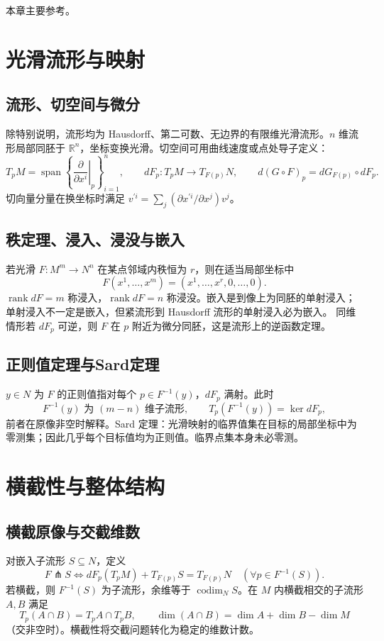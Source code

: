 \documentclass[../main.tex]{subfiles}
\begin{document}
本章主要参考\cite{lee,hatcher}。

\section{光滑流形与映射}
\subsection{流形、切空间与微分}
除特别说明，流形均为 Hausdorff、第二可数、无边界的有限维光滑流形。$n$ 维流形局部同胚于 $\mathbb R^n$，坐标变换光滑。切空间可用曲线速度或点处导子定义：
\[
T_pM=\operatorname{span}\left\{\left.\frac\partial{\partial x^i}\right|_p\right\}_{i=1}^n,
\qquad dF_p:T_pM\to T_{F(p)}N,
\qquad d(G\circ F)_p=dG_{F(p)}\circ dF_p.
\]
切向量分量在换坐标时满足 $v^{\prime i}=\sum_j(\partial x^{\prime i}/\partial x^j)v^j$。
\subsection{秩定理、浸入、浸没与嵌入}
若光滑 $F:M^m\to N^n$ 在某点邻域内秩恒为 $r$，则在适当局部坐标中
\[
F(x^1,\ldots,x^m)=(x^1,\ldots,x^r,0,\ldots,0).
\]
$\operatorname{rank}dF=m$ 称浸入，$\operatorname{rank}dF=n$ 称浸没。嵌入是到像上为同胚的单射浸入；单射浸入不一定是嵌入，但紧流形到 Hausdorff 流形的单射浸入必为嵌入。
同维情形若 $dF_p$ 可逆，则 $F$ 在 $p$ 附近为微分同胚，这是流形上的逆函数定理。
\subsection{正则值定理与Sard定理}
$y\in N$ 为 $F$ 的正则值指对每个 $p\in F^{-1}(y)$，$dF_p$ 满射。此时
\[
F^{-1}(y)\text{ 为 }(m-n)\text{ 维子流形},\qquad
T_p(F^{-1}(y))=\ker dF_p,
\]
前者在原像非空时解释。Sard 定理：光滑映射的临界值集在目标的局部坐标中为零测集；因此几乎每个目标值均为正则值。临界点集本身未必零测。
\section{横截性与整体结构}
\subsection{横截原像与交截维数}
对嵌入子流形 $S\subseteq N$，定义
\[
F\pitchfork S\iff dF_p(T_pM)+T_{F(p)}S=T_{F(p)}N
\quad(\forall p\in F^{-1}(S)).
\]
若横截，则 $F^{-1}(S)$ 为子流形，余维等于 $\operatorname{codim}_N S$。在 $M$ 内横截相交的子流形 $A,B$ 满足
\[
T_p(A\cap B)=T_pA\cap T_pB,\qquad
\dim(A\cap B)=\dim A+\dim B-\dim M
\]
（交非空时）。横截性将交截问题转化为稳定的维数计数。
\end{document}
